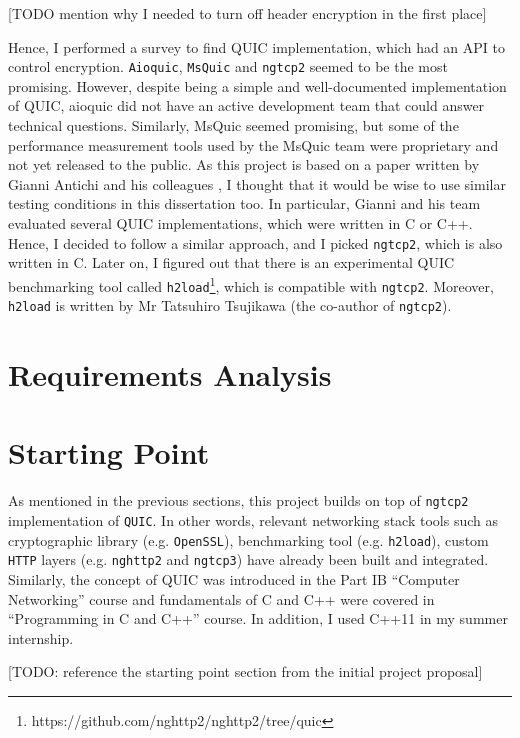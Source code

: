\documentclass[12pt,a4paper,twoside,openright]{report}
\begin{document}
[TODO mention why I needed to turn off header encryption in the first place]

Hence, I performed a survey to find QUIC implementation, which had an API to control encryption. 
\texttt{Aioquic}, \texttt{MsQuic} and \texttt{ngtcp2} seemed to be the most promising.
However, despite being a simple and well-documented implementation of QUIC, aioquic did not have an active development team that could answer technical questions.
Similarly, MsQuic seemed promising, but some of the performance measurement tools used by the MsQuic team were proprietary and not yet released to the public.
As this project is based on a paper written by Gianni Antichi and his colleagues \cite{Making_QUIC_Quicker}, I thought that it would be wise to use similar testing conditions in this dissertation too.
In particular, Gianni and his team evaluated several QUIC implementations, which were written in C or C++.
Hence, I decided to follow a similar approach, and I picked \texttt{ngtcp2}, which is also written in C.
Later on, I figured out that there is an experimental QUIC benchmarking tool called \texttt{h2load}\footnote{https://github.com/nghttp2/nghttp2/tree/quic}, which is compatible with \texttt{ngtcp2}.
Moreover, \texttt{h2load} is written by Mr Tatsuhiro  Tsujikawa (the co-author of \texttt{ngtcp2}).


\section{Requirements Analysis}


\section{Starting Point}
As mentioned in the previous sections, this project builds on top of \texttt{ngtcp2} implementation of \texttt{QUIC}.
In other words, relevant networking stack tools such as cryptographic library (e.g. \texttt{OpenSSL}), benchmarking tool (e.g. \texttt{h2load}), custom \texttt{HTTP} layers (e.g. \texttt{nghttp2} and \texttt{ngtcp3}) have already been built and integrated. 
Similarly, the concept of QUIC was introduced in the Part IB \enquote{Computer Networking} course and fundamentals of C and C++ were covered in \enquote{Programming in C and C++} course. 
In addition, I used C++11 in my summer internship.

[TODO: reference the starting point section from the initial project proposal]
\end{document}
